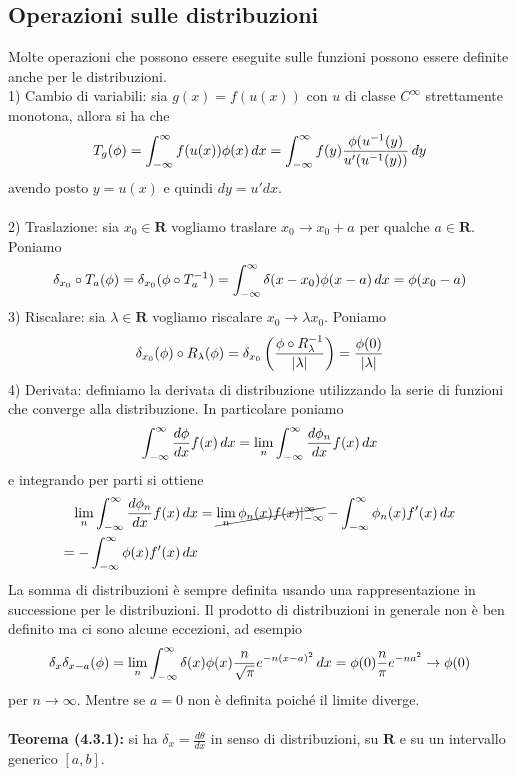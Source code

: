 \documentclass{article}
\begin{document}
\subsection{Operazioni sulle distribuzioni}
Molte operazioni che possono essere eseguite sulle funzioni possono essere definite anche per le distribuzioni. \\
1) Cambio di variabili: sia $g(x) = f(u(x))$ con $u$ di classe $C^\infty$ strettamente monotona, allora si ha che
\begin{gather}
    T_g(\phi) = \int_{-\infty}^\infty f(u(x))\phi(x) \, dx = \int_{-\infty}^\infty f(y)\frac{\phi(u^{-1}(y)}{u'(u^{-1}(y))} \, dy \notag
\end{gather}
avendo posto $y = u(x)$ e quindi $dy = u'dx$. \\ \\
2) Traslazione: sia $x_0 \in \mathbf{R}$ vogliamo traslare $x_0 \rightarrow x_0 + a$ per qualche $a \in \mathbf{R}$. Poniamo
\begin{gather}
    \delta_{x_0} \circ T_a(\phi) = \delta_{x_0}(\phi \circ T^{-1}_a) = \int_{-\infty}^\infty \delta(x - x_0)\phi(x - a) \, dx = \phi(x_0 - a) \notag
\end{gather}
3) Riscalare: sia $\lambda \in \mathbf{R}$ vogliamo riscalare $x_0 \rightarrow \lambda x_0$. Poniamo
\begin{gather}
    \delta_{x_0}(\phi) \circ R_\lambda(\phi) = \delta_{x_0}\left(\frac{\phi \circ R^{-1}_\lambda}{|\lambda|}\right) = \frac{\phi(0)}{|\lambda|} \notag
\end{gather}
4) Derivata: definiamo la derivata di distribuzione utilizzando la serie di funzioni che converge alla distribuzione. In particolare poniamo
\begin{gather}
    \int_{-\infty}^{\infty}\frac{d\phi}{dx}f(x) \, dx = \lim_n \int_{-\infty}^\infty\frac{d\phi_n}{dx}f(x) \, dx \notag
\end{gather}
e integrando per parti si ottiene
\begin{align}
    \lim_n \int_{-\infty}^\infty\frac{d\phi_n}{dx}f(x) \, dx &= \cancel{\lim_n \phi_n(x)f(x)|_{-\infty}^\infty} - \int_{-\infty}^\infty\phi_n(x)f'(x) \, dx \notag \\
    = -\int_{-\infty}^\infty\phi(x)f'(x) \, dx \notag
\end{align}
La somma di distribuzioni è sempre definita usando una rappresentazione in successione per le distribuzioni. Il prodotto di distribuzioni in generale non è ben definito ma ci sono alcune eccezioni, ad esempio
\begin{align}
    \delta_x\delta_{x - a}(\phi) = \lim_n \int_{-\infty}^\infty\delta(x)\phi(x)\frac{n}{\sqrt{\pi}}e^{-n(x - a)^2} \, dx = \phi(0)\frac{n}{\pi}e^{-na^2} \rightarrow \phi(0) \notag
\end{align}
per $n \rightarrow \infty$. Mentre se $a = 0$ non è definita poiché il limite diverge. \\ \\
\textbf{Teorema (4.3.1):} si ha $\delta_x = \frac{d\theta}{dx}$ in senso di distribuzioni, su $\mathbf{R}$ e su un intervallo generico $[a, b]$. \\
\end{document}
